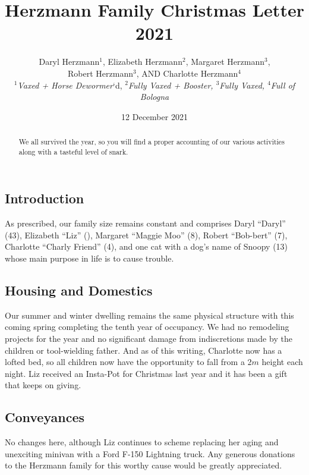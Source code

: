 \documentclass[letterpaper,11pt]{article}
\title{\vspace{-2.0cm}Herzmann Family Christmas Letter 2021}
\author{Daryl Herzmann${}^1$, Elizabeth Herzmann${}^2$, Margaret 
Herzmann${}^3$,\\
Robert Herzmann${}^3$, AND Charlotte Herzmann${}^4$ \\
\textit{${}^1$Vaxed + Horse Dewormer}`d,
\it{${}^2$Fully Vaxed + Booster},
\it{${}^3$Fully Vaxed},
\it{${}^4$Full of Bologna}}
\date{12 December 2021}
\begin{document}
\maketitle
\vspace{-0.75cm}
\begin{abstract}
We all survived the year, so you will find a proper accounting of our various
activities along with a tasteful level of snark.
\end{abstract}

\vspace{-0.5cm}

\noindent\makebox[\linewidth]{\rule{\textwidth}{1pt}}

\begin{multicols}{2}

\section{Introduction} 

As prescribed, our family size remains constant and comprises Daryl
\enquote{Daryl} (43), Elizabeth \enquote{Liz} (),
Margaret \enquote{Maggie Moo} (8), Robert \enquote{Bob-bert} (7), Charlotte
 \enquote{Charly Friend} (4), and one cat with a dog's name of Snoopy (13)
whose main purpose in life is to cause trouble.
   
\subsection{Housing and Domestics}

Our summer and winter dwelling remains the same physical structure with this
coming spring completing the tenth year of occupancy.  We had no remodeling projects
for the year and no significant damage from indiscretions made by the children
or tool-wielding father.  And as of this writing, Charlotte now has a lofted
bed, so all children now have the opportunity to fall from a 2$m$ height
each night.  Liz received an Insta-Pot for Christmas last year and it has
been a gift that keeps on giving.

\subsection{Conveyances}

No changes here, although Liz continues to scheme replacing her aging
and unexciting minivan with a Ford F-150 Lightning truck.  Any generous donations to the
Herzmann family for this worthy cause would be greatly appreciated.


\end{multicols}
\end{document}
